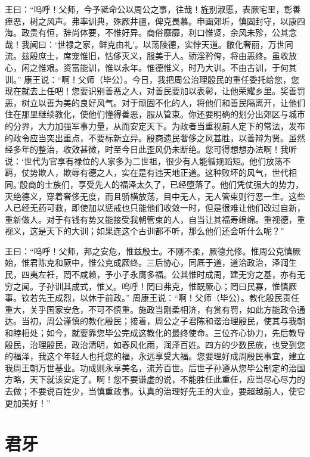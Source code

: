 \documentclass[a4paper,12pt,UTF8,twoside]{ctexbook}
\begin{document}
王曰：“呜呼！父师，今予祗命公以周公之事，往哉！旌别淑慝，表厥宅里，彰善瘅恶，树之风声。弗率训典，殊厥井疆，俾克畏慕。申画郊圻，慎固封守，以康四海。政贵有恒，辞尚体要，不惟好异。商俗靡靡，利口惟贤，余风未殄，公其念哉！我闻曰：‘世禄之家，鲜克由礼’。以荡陵德，实悖天道。敝化奢丽，万世同流。兹殷庶士，席宠惟旧，怙侈灭义，服美于人。骄淫矜侉，将由恶终。虽收放心，闲之惟艰。资富能训，惟以永年。惟德惟义，时乃大训。不由古训，于何其训。”
康王说：“啊！父师（毕公）。今日，我把周公治理殷民的重任委托给您，您现在就去上任吧！您要识别善恶之人，对善民要加以表彰，让他荣耀乡里。奖善罚恶，树立以善为美的良好风气。对于顽固不化的人，将他们和善民隔离开，让他们住在那里继续教化，使他们懂得善恶，服从管束。你还要明确的划分出郊区与城市的分界，大力加强军事力量，从而安定天下。为政者当重视前人定下的常法，发布的政令应当突出重点，不要标新立异。殷商遗民奢侈之风甚胜，以善辩为贤。虽然经多年的整治，收效甚微，时至今日此歪风仍未断绝。您可得想想办法啊！我听说：‘世代为官享有禄位的人家多为二世祖，很少有人能循规蹈矩。他们放荡不羁，仗势欺人，欺辱有德之人，实在是有违天地正道。这种败坏的风气，世代相同。’殷商的士族们，享受先人的福泽太久了，已经堕落了。他们凭仗强大的势力，灭绝德义，穿着奢侈无度，而且骄横放荡，目中无人，无人管束则行恶一生。这些人已经无药可救，即使加以惩戒也只能他们收敛一时，但是很难让他们改过自新，重新做人。对于有钱有势又能接受我朝管束的人，自当让其福寿绵绵。重视德，重视义，这是天下的大训；如果连这个古训都不听，那么他们还会听什么呢？”

王曰：“呜呼！父师，邦之安危，惟兹殷士。不刚不柔，厥德允修。惟周公克慎厥始，惟君陈克和厥中，惟公克成厥终。三后协心，同厎于道，道洽政治，泽润生民，四夷左衽，罔不咸赖，予小子永膺多福。公其惟时成周，建无穷之基，亦有无穷之闻。子孙训其成式，惟乂。呜呼！罔曰弗克，惟既厥心；罔曰民寡，惟慎厥事。钦若先王成烈，以休于前政。”
周康王说：“啊！父师（毕公）。教化殷民责任重大，关乎国家安危，不可不慎重。施政当刚柔相济，有赏有罚，如此方能政令通达。当初，周公谨慎的教化殷民；接着，周公之子君陈和谐治理殷民，使其与我朝和睦相处；如今，就要靠您毕公完成这教化的最终使命。三位齐心协力，先后教导殷民，治理殷民，政治清明，如春风化雨，润泽百姓。四方的少数民族，也受到您的福泽，我这个年轻人也托您的福，永远享受大福。您要理好成周殷民事宜，建立我周王朝万世基业。功成则永享美名，流芳百世。后世子孙遵从您毕公制定的治国方略，天下就该安定了。啊！您不要谦虚的说，不能胜任此重任，应当尽心尽力的去做；不要说百姓少，当慎重政事。认真的治理好先王的大业，要超越前人，使它更加美好！”

\chapter{君牙}
\end{document}
